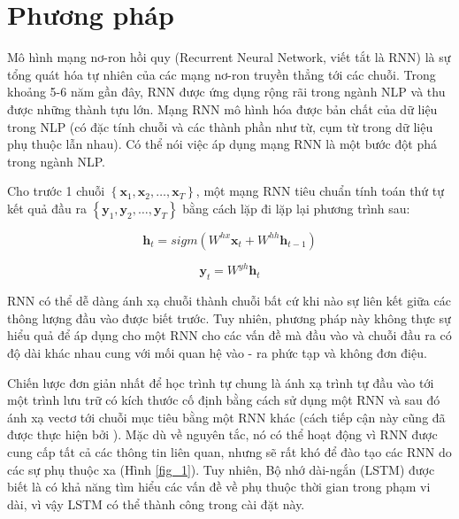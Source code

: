 \section{Phương pháp}

Mô hình mạng nơ-ron hồi quy (Recurrent Neural Network, viết tắt là RNN) \citep{werbos1990backpropagation, rumelhart1986learning} là sự tổng quát hóa tự nhiên của các mạng nơ-ron truyền thẳng tới các chuỗi. Trong khoảng 5-6 năm gần đây, RNN được ứng dụng rộng rãi trong ngành NLP và thu được những thành tựu lớn. Mạng RNN mô hình hóa được bản chất của dữ liệu trong NLP (có đặc tính chuỗi và các thành phần như từ, cụm từ trong dữ liệu phụ thuộc lẫn nhau). Có thể nói việc áp dụng mạng RNN là một bước đột phá trong ngành NLP.

Cho trước 1 chuỗi $\left\{\mathbf{x}_{1}, \mathbf{x}_{2}, \ldots, \mathbf{x}_{T}\right\}$, một mạng RNN tiêu chuẩn tính toán thứ tự kết quả đầu ra $\left\{\mathbf{y}_{1}, \mathbf{y}_{2}, \ldots, \mathbf{y}_{T}\right\}$ bằng cách lặp đi lặp lại phương trình sau:

\begin{equation}
\mathbf{h}_{t}=sigm\left(W^{hx}{\mathbf{x}_{t}} + W^{hh}{\mathbf{h}_{t-1}}\right)
\end{equation}

\begin{equation}
\mathbf{y}_{t}=W^{yh}{\mathbf{h}_{t}}
\end{equation}

RNN có thể dễ dàng ánh xạ chuỗi thành chuỗi bất cứ khi nào sự liên kết giữa các thông lượng đầu vào được biết trước. Tuy nhiên, phương pháp này không thực sự hiểu quả để áp dụng cho một RNN cho các vấn đề mà đầu vào và chuỗi đầu ra có độ dài khác nhau cung với mối quan hệ vào - ra phức tạp và không đơn điệu.

Chiến lược đơn giản nhất để học trình tự chung là ánh xạ trình tự đầu vào tới một trình lưu trữ có kích thước cố định bằng cách sử dụng một RNN và sau đó ánh xạ vectơ tới chuỗi mục tiêu bằng một RNN khác (cách tiếp cận này cũng đã được thực hiện bởi \citep{cho2014learning}). Mặc dù về nguyên tắc, nó có thể hoạt động vì RNN được cung cấp tất cả các thông tin liên quan, nhưng sẽ rất khó để đào tạo các RNN do các sự phụ thuộc xa (Hình \ref{fig_1}). Tuy nhiên, Bộ nhớ dài-ngắn (LSTM) \citep{HochreiterandSchmidhuber1997} được biết là có khả năng tìm hiểu các vấn đề về phụ thuộc thời gian trong phạm vi dài, vì vậy LSTM có thể thành công trong cài đặt này.

